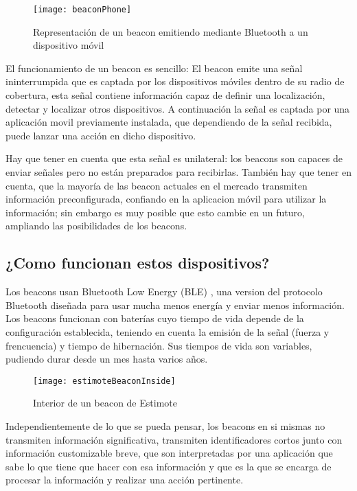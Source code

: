 \begin{figure}[h]
	\centering
	\texttt{[image: beaconPhone]}
	\caption{Representación de un beacon emitiendo mediante Bluetooth a un dispositivo móvil}
	\label{fig:beaconBluetooth}
\end{figure}

El funcionamiento de un beacon es sencillo: El beacon emite una señal ininterrumpida que es captada por los dispositivos móviles dentro de su radio de cobertura, esta señal contiene información capaz de definir una localización, detectar y localizar otros dispositivos. A continuación la señal es captada por una aplicación movil previamente instalada, que dependiendo de la señal recibida, puede lanzar una acción en dicho dispositivo.


Hay que tener en cuenta que esta señal es unilateral: los beacons son capaces de enviar señales pero no están preparados para recibirlas. También hay que tener en cuenta, que la mayoría de las beacon actuales en el mercado transmiten información preconfigurada, confiando en la aplicacion móvil para utilizar la información; sin embargo es muy posible que esto cambie en un futuro, ampliando las posibilidades de los beacons.

\subsection{¿Como funcionan estos dispositivos?}

Los beacons usan Bluetooth Low Energy (BLE) \cite{URL::BluetoothLowEnergy}, una version del protocolo Bluetooth diseñada para usar mucha menos energía y enviar menos información. Los beacons funcionan con baterías cuyo tiempo de vida depende de la configuración establecida, teniendo en cuenta la emisión de la señal (fuerza y frencuencia) y tiempo de hibernación. Sus tiempos de vida son variables, pudiendo durar desde un mes hasta varios años. 

\begin{figure}[h]
	\centering
	\texttt{[image: estimoteBeaconInside]}
	\caption{Interior de un beacon de Estimote}
	\label{fig:beaconInside}
\end{figure}

Independientemente de lo que se pueda pensar, los beacons en si mismas no transmiten información significativa, transmiten identificadores cortos junto con información customizable breve, que son interpretadas por una aplicación que sabe lo que tiene que hacer con esa información y que es la que se encarga de procesar la información y realizar una acción pertinente.

